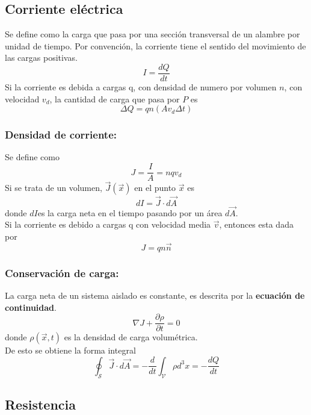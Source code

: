 \documentclass[a4paper, 10pt]{article}
\begin{document}
\begin{multicols*}{2}
	\subsection{Corriente eléctrica}
	Se define como la carga que pasa por una sección transversal de un alambre por unidad de tiempo. Por convención, la corriente tiene el sentido del movimiento de las cargas positivas.
	$$I = \frac{dQ}{dt}$$
	Si la corriente es debida a cargas q, con densidad de numero por volumen $n$, con velocidad $v_d$, la cantidad de carga que pasa por $P$ es
	$$\Delta Q= qn(Av_d\Delta t)$$
	
	\subsubsection{Densidad de corriente:} Se define como
	$$J=\frac{I}{A}=nqv_d$$
	Si se trata de un volumen, $\vec{J}(\vec{x})$ en el punto $\vec{x}$ es
	$$dI=\vec{J}\cdot d \vec{A}$$
	donde $dI$es la carga neta en el tiempo pasando por un área $d\vec{A}$.\\
	Si la corriente es debido a cargas q con velocidad media $\vec{v}$, entonces esta dada por
	$$J=qn\vec{n}$$
	    
	\subsubsection{Conservación de carga:} La carga neta de un sistema aislado es constante, es descrita por la \textbf{ecuación de continuidad}.
	$$\nabla J + \frac{\partial \rho}{\partial t} = 0$$
	donde $\rho(\vec{x},t)$ es la densidad de carga volumétrica.\\
	De esto se obtiene la forma integral $$\oint_{\mathcal{S}}\vec{J}\cdot d\vec{A}=-\frac{d}{dt}\int_{\mathcal{V}}\rho d^3 x=-\frac{dQ}{dt}$$
	    
	\subsection{Resistencia}

\end{multicols*}
\end{document}
